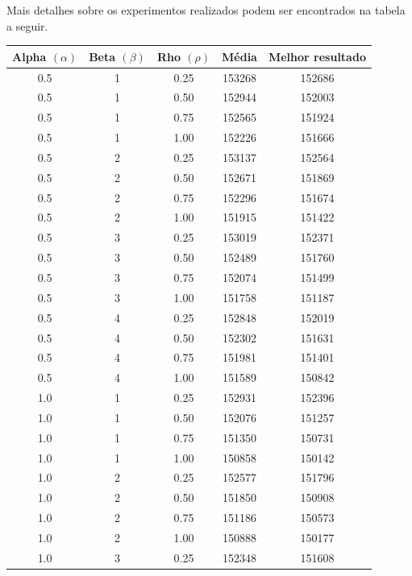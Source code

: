 \documentclass{article}
\begin{document}
Mais detalhes sobre os experimentos realizados podem ser encontrados na tabela a seguir.

  \begin{longtable}[htbp]{|c|c|c|c|c|}
    \hline
    \textbf{Alpha} $(\alpha)$ & \textbf{Beta} $(\beta)$ & \textbf{Rho} $(\rho)$ & \textbf{Média} &  \textbf{Melhor resultado} \\ \hline

    0.5 & 1 & 0.25 & 153268 & 152686 \\ \hline
    0.5 & 1 & 0.50 & 152944 & 152003 \\ \hline
    0.5 & 1 & 0.75 & 152565 & 151924 \\ \hline
    0.5 & 1 & 1.00 & 152226 & 151666 \\ \hline
    0.5 & 2 & 0.25 & 153137 & 152564 \\ \hline
    0.5 & 2 & 0.50 & 152671 & 151869 \\ \hline
    0.5 & 2 & 0.75 & 152296 & 151674 \\ \hline
    0.5 & 2 & 1.00 & 151915 & 151422 \\ \hline
    0.5 & 3 & 0.25 & 153019 & 152371 \\ \hline
    0.5 & 3 & 0.50 & 152489 & 151760 \\ \hline
    0.5 & 3 & 0.75 & 152074 & 151499 \\ \hline
    0.5 & 3 & 1.00 & 151758 & 151187 \\ \hline
    0.5 & 4 & 0.25 & 152848 & 152019 \\ \hline
    0.5 & 4 & 0.50 & 152302 & 151631 \\ \hline
    0.5 & 4 & 0.75 & 151981 & 151401 \\ \hline
    0.5 & 4 & 1.00 & 151589 & 150842 \\ \hline
    1.0 & 1 & 0.25 & 152931 & 152396 \\ \hline
    1.0 & 1 & 0.50 & 152076 & 151257 \\ \hline
    1.0 & 1 & 0.75 & 151350 & 150731 \\ \hline
    1.0 & 1 & 1.00 & 150858 & 150142 \\ \hline
    1.0 & 2 & 0.25 & 152577 & 151796 \\ \hline
    1.0 & 2 & 0.50 & 151850 & 150908 \\ \hline
    1.0 & 2 & 0.75 & 151186 & 150573 \\ \hline
    1.0 & 2 & 1.00 & 150888 & 150177 \\ \hline
    1.0 & 3 & 0.25 & 152348 & 151608 \\ \hline

\end{longtable}
\end{document}
